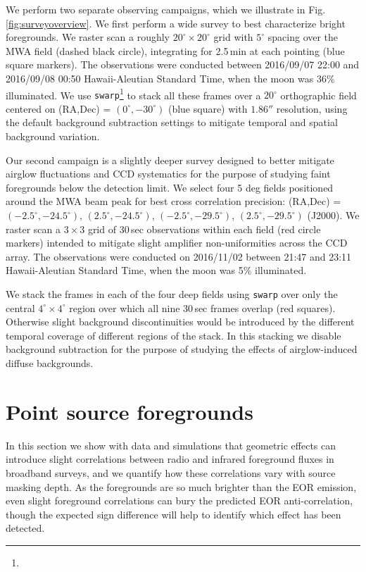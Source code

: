 \documentclass[numberedappendix]{emulateapj}
\begin{document}
We perform two separate observing campaigns, which we illustrate in Fig. \ref{fig:surveyoverview}. We first perform a wide survey to best characterize bright foregrounds. We raster scan a roughly $20^\circ\times20^\circ$ grid with $5^\circ$ spacing over the MWA field (dashed black circle), integrating for 2.5\,min at each pointing (blue square markers). The observations were conducted between 2016/09/07 22:00  and 2016/09/08 00:50 Hawaii-Aleutian Standard Time, when the moon was 36\% illuminated. We use {\tt swarp}\footnote{} \citep{swarp} to stack all these frames over a $20^\circ$ orthographic field centered on (RA,Dec) = $(0^\circ,-30^\circ)$ (blue square) with $1.86''$ resolution, using the default background subtraction settings to mitigate temporal and spatial background variation. 


Our second campaign is a slightly deeper survey designed to better mitigate airglow fluctuations and CCD systematics for the purpose of studying faint foregrounds below the detection limit. We select four 5 deg fields positioned around the MWA beam peak for best cross correlation precision: (RA,Dec) = $(-2.5^\circ, -24.5^\circ)$, $(2.5^\circ, -24.5^\circ)$, $(-2.5^\circ, -29.5^\circ)$, $(2.5^\circ, -29.5^\circ)$ (J2000). We raster scan a $3\times3$ grid of 30\,sec observations within each field (red circle markers) intended to mitigate slight amplifier non-uniformities across the CCD array. The observations were conducted on 2016/11/02 between 21:47 and 23:11 Hawaii-Aleutian Standard Time, when the moon was 5\% illuminated. 

We stack the frames in each of the four deep fields using {\tt swarp} over only the central $4^\circ\times 4^\circ$ region over which all nine 30\,sec frames overlap (red squares). Otherwise slight background discontinuities would be introduced by the different temporal coverage of different regions of the stack. In this stacking we disable background subtraction for the purpose of studying the effects of airglow-induced diffuse backgrounds.

\section{Point source foregrounds}
\label{sec:pointsourcefgs}

In this section we show with data and simulations that geometric effects can introduce slight correlations between radio and infrared foreground fluxes in broadband surveys, and we quantify how these correlations vary with source masking depth. As the foregrounds are so much brighter than the EOR emission, even slight foreground correlations can bury the predicted EOR anti-correlation, though the expected sign difference will help to identify which effect has been detected.
\end{document}
